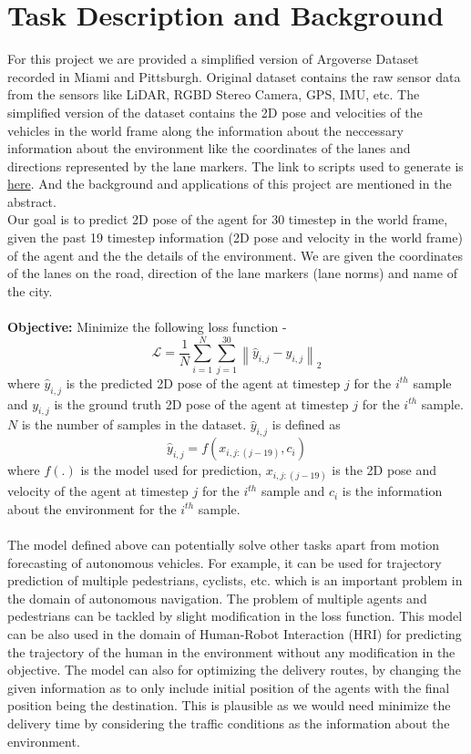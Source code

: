 \documentclass{article}
\begin{document}
\section{Task Description and Background}
For this project we are provided a simplified version of Argoverse Dataset recorded in Miami and Pittsburgh. Original dataset contains
the raw sensor data from the sensors like LiDAR, RGBD Stereo Camera, GPS, IMU, etc. The simplified version of the dataset contains the
2D pose and velocities of the vehicles in the world frame along the information about the neccessary information about the environment like the 
coordinates of the lanes and directions represented by the lane markers. The link to scripts used to generate is \href{https://github.com/awiesmu11a/Autonomous_Vehicle_tracking}{here}. And the
background and applications of this project are mentioned in the abstract.
\\
Our goal is to predict 2D pose of the agent for 30 timestep in the world frame, given the past 19 timestep information (2D pose and velocity in the world frame) of the agent and the
the details of the environment. We are given the coordinates of the lanes on the road, direction of the lane markers (lane norms) and name of the city.
\\
\\
\textbf{Objective:} Minimize the following loss function -
\begin{equation}
    \mathcal{L} = \frac{1}{N}\sum_{i=1}^{N}\sum_{j=1}^{30}\left \| \hat{y}_{i,j} - y_{i,j} \right \|_{2}
\end{equation}
where $\hat{y}_{i,j}$ is the predicted 2D pose of the agent at timestep $j$ for the $i^{th}$ sample and $y_{i,j}$ is the ground truth 2D pose of the agent at timestep $j$ for the $i^{th}$ sample.
$N$ is the number of samples in the dataset. $\hat{y}_{i,j}$ is defined as
\begin{equation}
    \hat{y}_{i,j} = f(x_{i,j:(j-19)}, c_{i})
\end{equation}
where $f(.)$ is the model used for prediction, $x_{i,j:(j-19)}$ is the 2D pose and velocity of the agent at timestep $j$ for the $i^{th}$ sample and $c_{i}$ is the information about the environment for the $i^{th}$ sample.
\\
\\
The model defined above can potentially solve other tasks apart from motion forecasting of autonomous vehicles. For example, it can be used for trajectory prediction of multiple pedestrians, cyclists, etc.
which is an important problem in the domain of autonomous navigation. The problem of multiple agents and pedestrians can be tackled by slight modification in the loss function. This model can be also
used in the domain of Human-Robot Interaction (HRI) for predicting the trajectory of the human in the environment without any modification in the objective. The model can also for optimizing the delivery routes,
by changing the given information as to only include initial position of the agents with the final position being the destination. This is plausible as we would need 
minimize the delivery time by considering the traffic conditions as the information about the environment.
\end{document}
